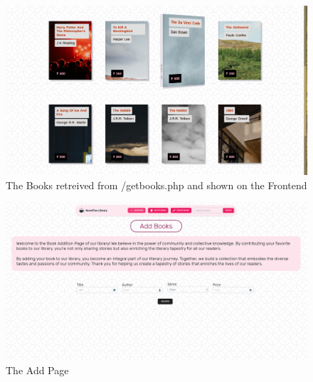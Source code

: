 \documentclass[11pt]{article}
\begin{document}
\begin{figure}[H]
    \centering
    \includegraphics[width=.95\textwidth]{Screenshots/books.png}
    \caption{The Books retreived from /getbooks.php and shown on the Frontend}
\end{figure}

\begin{figure}[H]
    \centering
    \includegraphics[width=.95\textwidth]{Screenshots/add.png}
    \caption{The Add Page}
\end{figure}
\end{document}
